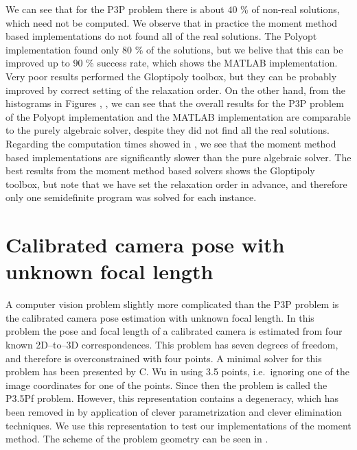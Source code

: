 We can see that for the P3P problem there is about $40$ \% of non-real solutions, which need not be computed.
We observe that in practice the moment method based implementations do not found all of the real solutions.
The Polyopt implementation found only $80$ \% of the solutions, but we belive that this can be improved up to $90$ \% success rate, which shows the MATLAB implementation.
Very poor results performed the Gloptipoly toolbox, but they can be probably improved by correct setting of the relaxation order.
On the other hand, from the histograms in Figures , ,  we can see that the overall results for the P3P problem of the Polyopt implementation and the MATLAB implementation are comparable to the purely algebraic solver, despite they did not find all the real solutions.
Regarding the computation times showed in , we see that the moment method based implementations are significantly slower than the  pure algebraic solver.
The best results from the moment method based solvers shows the Gloptipoly \cite{gloptipoly} toolbox, but note that we have set the relaxation order in advance, and therefore only one semidefinite program was solved for each instance.

\section{Calibrated camera pose with unknown focal length}

A computer vision problem slightly more complicated than the P3P problem is the calibrated camera pose estimation with unknown focal length.
In this problem the pose and focal length of a calibrated camera is estimated from four known 2D--to--3D correspondences.
This problem has seven degrees of freedom, and therefore is overconstrained with four points.
A minimal solver for this problem has been presented by C. Wu in \cite{P35PfWu} using 3.5 points, i.e.\ ignoring one of the image coordinates for one of the points.
Since then the problem is called the P3.5Pf problem.
However, this representation contains a degeneracy, which has been removed in \cite{P35Pf} by application of clever parametrization and clever elimination techniques.
We use this representation to test our implementations of the moment method.
The scheme of the problem geometry can be seen in .

